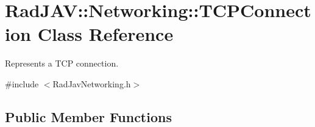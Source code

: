\hypertarget{class_rad_j_a_v_1_1_networking_1_1_t_c_p_connection}{}\section{Rad\+J\+AV\+:\+:Networking\+:\+:T\+C\+P\+Connection Class Reference}
\label{class_rad_j_a_v_1_1_networking_1_1_t_c_p_connection}


Represents a T\+CP connection.  




{\ttfamily \#include $<$Rad\+Jav\+Networking.\+h$>$}

\subsection*{Public Member Functions}
